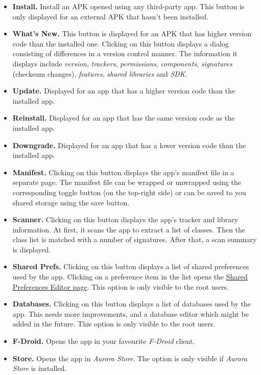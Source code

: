 \begin{itemize}
    \item \textbf{Install.} Install an APK opened using any third-party app. This button is only displayed for an
    external APK that hasn't been installed.

    \item \textbf{What's New.} This button is displayed for an APK that has higher version code than the installed one.
    Clicking on this button displays a dialog consisting of differences in a version control manner. The information it
    displays include \textit{version}, \textit{trackers}, \textit{permissions}, \textit{components}, \textit{signatures}
    (checksum changes), \textit{features}, \textit{shared libraries} and \textit{SDK}.

    \item \textbf{Update.} Displayed for an app that has a higher version code than the installed app.

    \item \textbf{Reinstall.} Displayed for an app that has the same version code as the installed app.

    \item \textbf{Downgrade.} Displayed for an app that has a lower version code than the installed app.

    \item \textbf{Manifest.} Clicking on this button displays the app's manifest file in a separate page. The manifest
    file can be wrapped or unwrapped using the corresponding toggle button (on the top-right side) or can be saved to
    you shared storage using the save button.

    \item \textbf{Scanner.} Clicking on this button displays the app's tracker and library information. At first, it
    scans the app to extract a list of classes. Then the class list is matched with a number of signatures. After that,
    a scan summary is displayed.\\

    \item \textbf{Shared Prefs.} Clicking on this button displays a list of shared preferences used by the app. Clicking
    on a preference item in the list opens the \hyperref[sec:shared-preferences-editor-page]{Shared Preferences Editor
    page}. This option is only visible to the root users.

    \item \textbf{Databases.} Clicking on this button displays a list of databases used by the app. This needs more
    improvements, and a database editor which might be added in the future. This option is only visible to the root users.

    \item \textbf{F-Droid.} Opens the app in your favourite \textit{F-Droid} client.

    \item \textbf{Store.} Opens the app in \textit{Aurora Store}. The option is only visible if \textit{Aurora Store} is
    installed.
\end{itemize}

